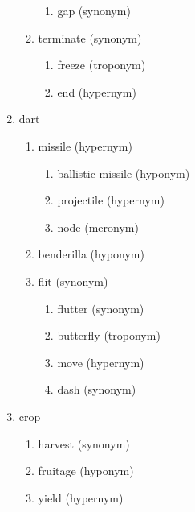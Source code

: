 \documentclass[11pt,a4paper,twocolumn]{article}
\begin{document}
\begin{enumerate}
\begin{enumerate}
\begin{enumerate}
							\item gap (synonym)
						\end{enumerate}
						
					\item terminate (synonym)
						\begin{enumerate}
							\item freeze (troponym)
							
							\item end (hypernym)
						\end{enumerate}
				\end{enumerate}
			
			\item dart
				\begin{enumerate}
					\item missile (hypernym)
						\begin{enumerate}
							\item ballistic missile (hyponym)
							
							\item projectile (hypernym)
							
							\item node (meronym)
						\end{enumerate}
						
					\item benderilla (hyponym)
					
					\item flit (synonym)
						\begin{enumerate}
							\item flutter (synonym)
							
							\item butterfly (troponym)
							
							\item move (hypernym)
							
							\item dash (synonym)
						\end{enumerate}
				\end{enumerate}
			
			\item crop
				\begin{enumerate}
					\item harvest (synonym)
					
					\item fruitage (hyponym)
					
					\item yield (hypernym)
					

\end{enumerate}
\end{enumerate}
\end{document}
